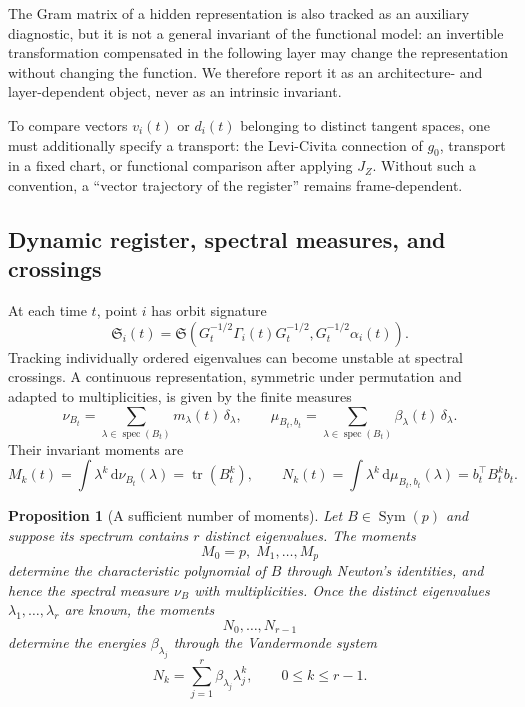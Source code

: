 \documentclass[10pt,a4paper]{article}
\newtheorem{proposition}[theorem]{Proposition}
\newcommand{\tr}{\operatorname{tr}}
\newcommand{\spec}{\operatorname{spec}}
\newcommand{\dd}{\mathrm d}
\newcommand{\Sigreg}{\mathfrak S}
\begin{document}
The Gram matrix of a hidden representation is also tracked as an auxiliary diagnostic, but it is not a general invariant of the functional model: an invertible transformation compensated in the following layer may change the representation without changing the function. We therefore report it as an architecture- and layer-dependent object, never as an intrinsic invariant.

To compare vectors $v_i(t)$ or $d_i(t)$ belonging to distinct tangent spaces, one must additionally specify a transport: the Levi-Civita connection of $g_0$, transport in a fixed chart, or functional comparison after applying $J_Z$. Without such a convention, a ``vector trajectory of the register'' remains frame-dependent.

\subsection{Dynamic register, spectral measures, and crossings}
At each time $t$, point $i$ has orbit signature
\begin{equation}
\Sigreg_i(t)=\Sigreg\left(G_t^{-1/2}\Gamma_i(t)G_t^{-1/2},
G_t^{-1/2}\alpha_i(t)\right).
\end{equation}
Tracking individually ordered eigenvalues can become unstable at spectral crossings. A continuous representation, symmetric under permutation and adapted to multiplicities, is given by the finite measures
\begin{equation}
\nu_{B_t}=\sum_{\lambda\in\spec(B_t)}m_\lambda(t)\,\delta_\lambda,
\qquad
\mu_{B_t,b_t}=\sum_{\lambda\in\spec(B_t)}\beta_\lambda(t)\,\delta_\lambda.
\label{eq:spectral-measures}
\end{equation}
Their invariant moments are
\begin{equation}
M_k(t)=\int \lambda^k\,\dd\nu_{B_t}(\lambda)=\tr(B_t^k),
\qquad
N_k(t)=\int \lambda^k\,\dd\mu_{B_t,b_t}(\lambda)=b_t^\top B_t^k b_t.
\label{eq:spectral-moments}
\end{equation}
\begin{proposition}[A sufficient number of moments]
Let $B\in\operatorname{Sym}(p)$ and suppose its spectrum contains $r$ distinct eigenvalues. The moments
\[
M_0=p,\;M_1,\ldots,M_p
\]
determine the characteristic polynomial of $B$ through Newton's identities, and hence the spectral measure $\nu_B$ with multiplicities. Once the distinct eigenvalues $\lambda_1,\ldots,\lambda_r$ are known, the moments
\[
N_0,\ldots,N_{r-1}
\]
determine the energies $\beta_{\lambda_j}$ through the Vandermonde system
\[
N_k=\sum_{j=1}^r\beta_{\lambda_j}\lambda_j^k,
\qquad 0\le k\le r-1.
\]
\end{proposition}
\end{document}
